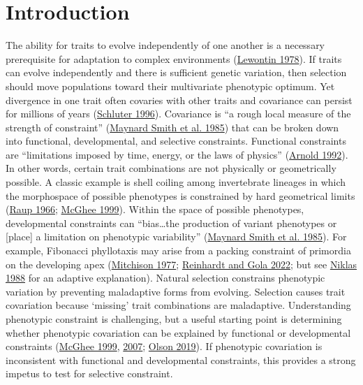 \documentclass[
  12pt,
]{article}
\begin{document}
\newpage{}

\hypertarget{introduction}{%
\section{Introduction}\label{introduction}}

The ability for traits to evolve independently of one another is a necessary prerequisite for adaptation to complex environments (\protect\hyperlink{ref-lewontin_adaptation_1978}{Lewontin 1978}). If traits can evolve independently and there is sufficient genetic variation, then selection should move populations toward their multivariate phenotypic optimum. Yet divergence in one trait often covaries with other traits and covariance can persist for millions of years (\protect\hyperlink{ref-schluter_adaptive_1996}{Schluter 1996}). Covariance is ``a rough local measure of the strength of constraint'' (\protect\hyperlink{ref-maynard_smith_developmental_1985}{Maynard Smith et al. 1985}) that can be broken down into functional, developmental, and selective constraints. Functional constraints are ``limitations imposed by time, energy, or the laws of physics'' (\protect\hyperlink{ref-arnold_constraints_1992}{Arnold 1992}). In other words, certain trait combinations are not physically or geometrically possible. A classic example is shell coiling among invertebrate lineages in which the morphospace of possible phenotypes is constrained by hard geometrical limits (\protect\hyperlink{ref-raup_geometric_1966}{Raup 1966}; \protect\hyperlink{ref-mcghee_theoretical_1999}{McGhee 1999}). Within the space of possible phenotypes, developmental constraints can ``bias\ldots the production of variant phenotypes or {[}place{]} a limitation on phenotypic variability'' (\protect\hyperlink{ref-maynard_smith_developmental_1985}{Maynard Smith et al. 1985}). For example, Fibonacci phyllotaxis may arise from a packing constraint of primordia on the developing apex (\protect\hyperlink{ref-mitchison_phyllotaxis_1977}{Mitchison 1977}; \protect\hyperlink{ref-reinhardt_law_2022}{Reinhardt and Gola 2022}; but see \protect\hyperlink{ref-niklas_role_1988}{Niklas 1988} for an adaptive explanation). Natural selection constrains phenotypic variation by preventing maladaptive forms from evolving. Selection causes trait covariation because `missing' trait combinations are maladaptive. Understanding phenotypic constraint is challenging, but a useful starting point is determining whether phenotypic covariation can be explained by functional or developmental constraints (\protect\hyperlink{ref-mcghee_theoretical_1999}{McGhee 1999}, \protect\hyperlink{ref-mcghee_geometry_2007}{2007}; \protect\hyperlink{ref-olson_plant_2019}{Olson 2019}). If phenotypic covariation is inconsistent with functional and developmental constraints, this provides a strong impetus to test for selective constraint.
\end{document}
